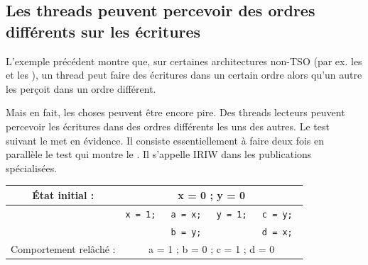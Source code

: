 

\subsection{Les threads peuvent percevoir des ordres différents sur les écritures}

L'exemple précédent montre que, sur certaines architectures non-TSO (par ex. les
 et les ), un thread peut faire des écritures dans un
certain ordre alors qu'un autre les perçoit dans un ordre différent.

Mais en fait, les choses peuvent être encore pire. Des threads \og lecteurs\fg{}
peuvent percevoir les écritures dans des ordres différents les uns des
autres. Le test suivant le met en évidence. Il consiste essentiellement à faire
deux fois en parallèle le test qui montre le . Il
s'appelle IRIW dans les publications spécialisées.

\begin{center}
\begin{tabular}{|c|p{2cm}||p{2cm}||p{2cm}||p{2cm}|}
  \hline
  État initial : & \multicolumn{4}{c|}{x = 0 ; y = 0} \\
  \hline
  & \tt x = 1; & \tt a = x; & \tt y = 1; & \tt c = y; \\
  & \tt        & \tt b = y; &            & \tt d = x; \\
  \hline
  Comportement relâché : & \multicolumn{4}{c|}{a = 1 ; b = 0 ; c = 1 ; d = 0} \\
  \hline
\end{tabular}
\end{center}



